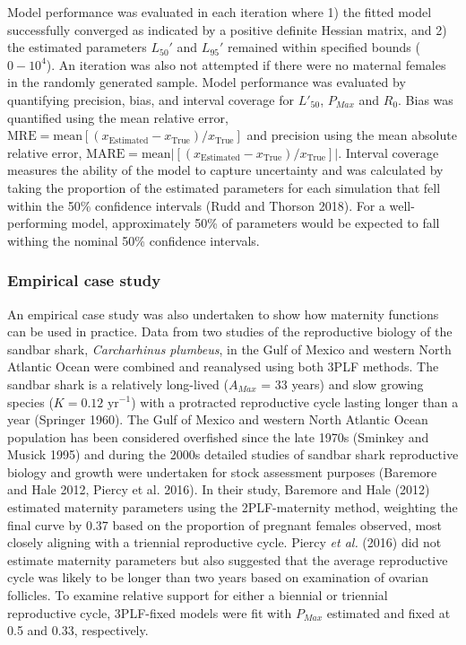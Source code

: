 \documentclass[
]{article}
\begin{document}
Model performance was evaluated in each iteration where 1) the fitted model successfully converged as indicated by a positive definite Hessian matrix, and 2) the estimated parameters \(L_{50}'\) and \(L_{95}'\) remained within specified bounds (\(0 - 10^4\)). An iteration was also not attempted if there were no maternal females in the randomly generated sample. Model performance was evaluated by quantifying precision, bias, and interval coverage for \(L'_{50}\), \(P_{Max}\) and \(R_0\). Bias was quantified using the mean relative error, \(\text{MRE} = \text{mean}[(x_{\text{Estimated}} - x_{\text{True}})/x_{\text{True}}]\) and precision using the mean absolute relative error, \(\text{MARE} = \text{mean}|[(x_{\text{Estimated}} - x_{\text{True}})/x_{\text{True}}]|\). Interval coverage measures the ability of the model to capture uncertainty and was calculated by taking the proportion of the estimated parameters for each simulation that fell within the 50\% confidence intervals (Rudd and Thorson 2018). For a well-performing model, approximately 50\% of parameters would be expected to fall withing the nominal 50\% confidence intervals.

\subsubsection{Empirical case study}\label{empirical-case-study}

An empirical case study was also undertaken to show how maternity functions can be used in practice. Data from two studies of the reproductive biology of the sandbar shark, \emph{Carcharhinus plumbeus}, in the Gulf of Mexico and western North Atlantic Ocean were combined and reanalysed using both 3PLF methods. The sandbar shark is a relatively long-lived (\(A_{Max}\) = 33 years) and slow growing species (\(K = 0.12 \text{ yr}^{-1}\)) with a protracted reproductive cycle lasting longer than a year (Springer 1960). The Gulf of Mexico and western North Atlantic Ocean population has been considered overfished since the late 1970s (Sminkey and Musick 1995) and during the 2000s detailed studies of sandbar shark reproductive biology and growth were undertaken for stock assessment purposes (Baremore and Hale 2012, Piercy et al. 2016). In their study, Baremore and Hale (2012) estimated maternity parameters using the 2PLF-maternity method, weighting the final curve by 0.37 based on the proportion of pregnant females observed, most closely aligning with a triennial reproductive cycle. Piercy \emph{et al.} (2016) did not estimate maternity parameters but also suggested that the average reproductive cycle was likely to be longer than two years based on examination of ovarian follicles. To examine relative support for either a biennial or triennial reproductive cycle, 3PLF-fixed models were fit with \(P_{Max}\) estimated and fixed at 0.5 and 0.33, respectively.
\end{document}
